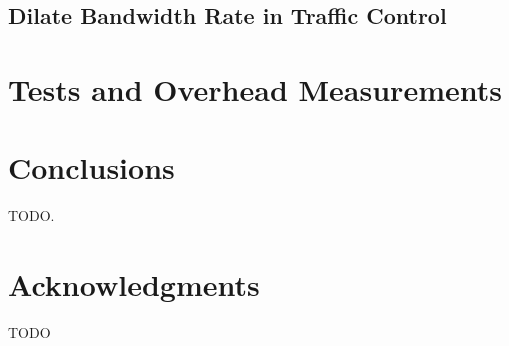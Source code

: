\documentclass{acm_proc_article-sp}
\begin{document}
\subsection{Dilate Bandwidth Rate in Traffic Control}

\section{Tests and Overhead Measurements}

\section{Conclusions}
TODO\cite{Lamport:LaTeX}.

\section{Acknowledgments}
TODO
%


%
%
\balancecolumns
\end{document}
